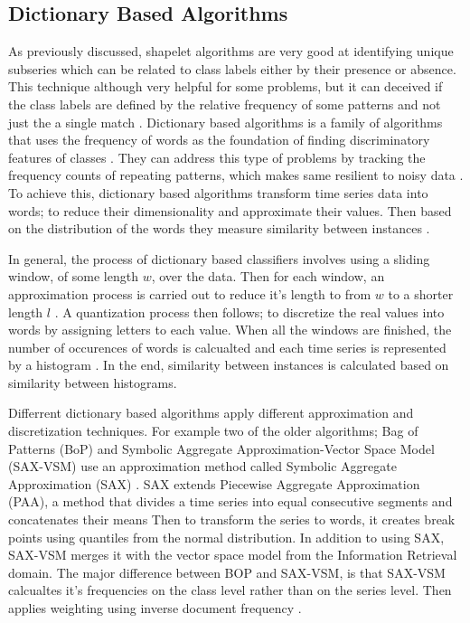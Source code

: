 \subsection{Dictionary Based Algorithms}
\label{SubsectionDictionary}
As previously discussed, shapelet algorithms are very good at identifying unique subseries which can be related to class labels either by their presence or absence.
This technique although very helpful for some problems, but it can deceived if the class labels are defined by the relative frequency of some patterns and not just the a single match \cite{large2018bop,bagnall2017great}.
Dictionary based algorithms is a family of algorithms that uses the frequency of words as the foundation of finding discriminatory features of classes \cite{middlehurst2019scalable}.
They can address this type of problems by tracking the frequency counts of repeating patterns, which makes same resilient to noisy data \cite{shifaz2020ts}.
To achieve this, dictionary based algorithms transform time series data into words; to reduce their dimensionality and approximate their values.
Then based on the distribution of the words they measure similarity between instances \cite{lin2012rotation,schafer2015boss}.

In general, the process of dictionary based classifiers involves using a sliding window, of some length $w$, over the data.
Then for each window, an approximation process is carried out to reduce it's length to from $w$ to a shorter length $l$ \cite{bagnall2020tale}.
A quantization process then follows; to discretize the real values into words by assigning letters to each value.
When all the windows are finished, the number of occurences of words is calcualted and each time series is represented by a histogram \cite{shifaz2020ts}.
In the end, similarity between instances is calculated based on similarity between histograms.

Differrent dictionary based algorithms apply different approximation and discretization techniques.
For example two of the older algorithms; Bag of Patterns (BoP) \cite{lin2012rotation} and Symbolic Aggregate Approximation-Vector Space Model (SAX-VSM) \cite{senin2013sax}
use an approximation method called Symbolic Aggregate Approximation (SAX) \cite{lin2007experiencing}.
SAX extends Piecewise Aggregate Approximation (PAA), a method that divides a time series into equal consecutive segments and concatenates their means \cite{shifaz2020ts}
Then to transform the series to words, it creates break points using quantiles from the normal distribution.
In addition to using SAX, SAX-VSM merges it with the vector space model from the Information Retrieval domain.
The major difference between BOP and SAX-VSM, is that SAX-VSM calcualtes it's frequencies on the class level rather than on the series level.
Then applies weighting using inverse document frequency \cite{bagnall2017great}.

